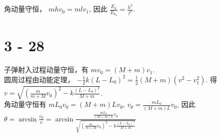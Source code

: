 \documentclass{article}
\begin{document}
角动量守恒， $mhv_0 = mlv_1$, 因此 $\frac{E_k}{E_{k_0}} = \frac{h^2}{l^2}$.

\section*{3 - 28}

子弹射入过程动量守恒，有 $mv_0 = (M + m)v_1$. \\
圆周过程由动能定理， $-\frac{1}{2}k(L - L_0)^2 = \frac{1}{2}(M + m)(v^2 - v_1^2)$. 得 $v = \sqrt{\left(\frac{m}{m + M}v_0\right)^2 - k\frac{(L - L_0)^2}{M + m}}$. \\
角动量守恒有 $mL_0v_0 = (M + m)Lv_\theta$, $v_\theta = \frac{mL_0}{(M + m)L}v_0$, 因此 $\theta = \arcsin \frac{v_\theta}{v} = \arcsin \frac{\frac{mL_0}{(M + m)L}v_0}{\sqrt{\left(\frac{m}{m + M}v_0\right)^2 - k\frac{(L - L_0)^2}{M + m}}}$
\end{document}
